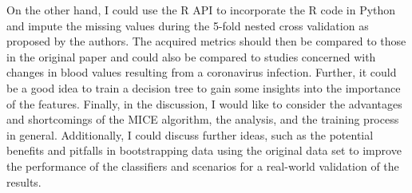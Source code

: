 \documentclass[12pt,a4paper,oneside]{article}
\begin{document}
On the other hand, I could use the R API to incorporate the R code in Python and impute the missing values during the 5-fold nested cross validation as proposed by the authors.
The acquired metrics should then be compared to those in the original paper and could also be compared to studies concerned with changes in blood values resulting from a coronavirus infection. Further, it could be a good idea to train a decision tree to gain some insights into the importance of the features. Finally, in the discussion, I would like to consider the advantages and shortcomings of the MICE algorithm, the analysis, and the training process in general. Additionally, I could discuss further ideas, such as the potential benefits and pitfalls in bootstrapping data using the original data set to improve the performance of the classifiers and scenarios for a real-world validation of the results.
\printbibliography
\end{document}

